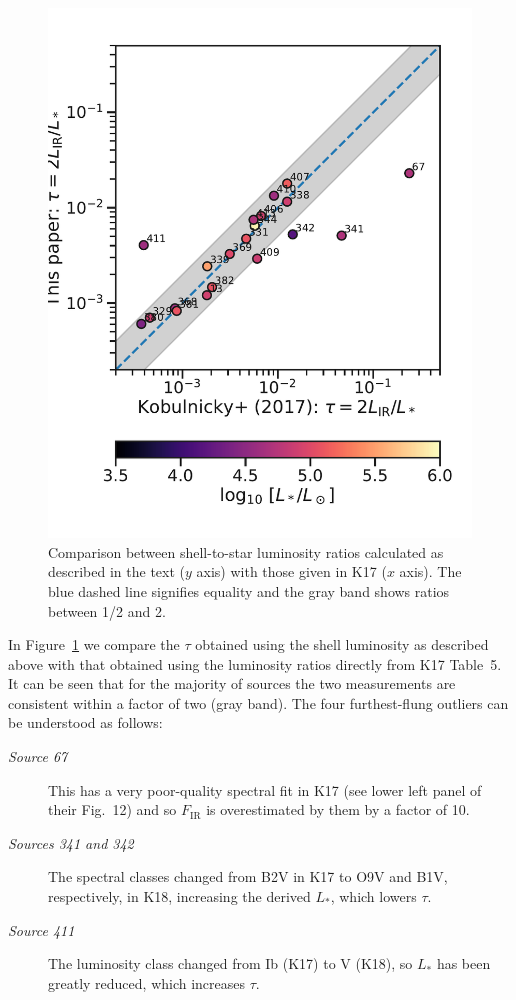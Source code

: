 \begin{figure}
  \centering
  \includegraphics[width=\linewidth]{figs/K17-tau-comparison}
  \caption{Comparison between shell-to-star luminosity ratios
    calculated as described in the text (\(y\) axis) with those given
    in K17 (\(x\) axis).  The blue dashed line signifies equality and
    the gray band shows ratios between 1/2 and 2.}
  \label{fig:k17-k18-comparison}
\end{figure}

In Figure~\ref{fig:k17-k18-comparison} we compare the \(\tau\) obtained
using the shell luminosity as described above with that obtained using
the luminosity ratios directly from K17 Table~5.  It can be seen that
for the majority of sources the two measurements are consistent within
a factor of two (gray band).  The four furthest-flung outliers can be
understood as follows:
\begin{description}
\item[\textit{Source 67}] This has a very poor-quality spectral fit in
  K17 (see lower left panel of their Fig.~12) and so 
  \(F_{\text{IR}}\) is overestimated by them by a factor of 10.
\item[\textit{Sources 341 and 342}] The spectral classes changed from
  B2V in K17 to O9V and B1V, respectively, in K18, increasing the
  derived \(L_*\), which lowers \(\tau\).
\item[\textit{Source 411}] The luminosity class changed from Ib (K17)
  to V (K18), so \(L_*\) has been greatly reduced, which increases
  \(\tau\).
\end{description}


